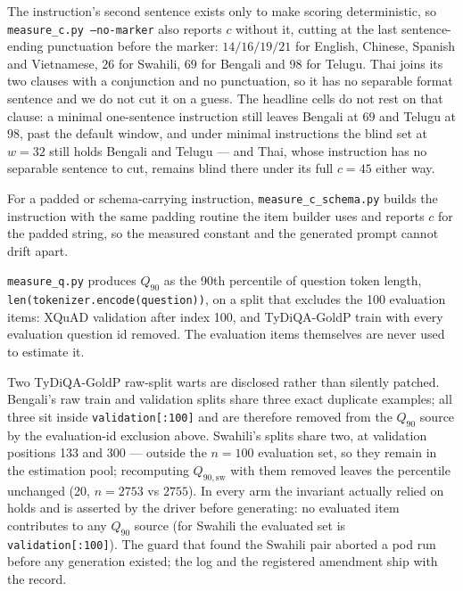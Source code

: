 \documentclass{article}
\begin{document}
The instruction's second sentence exists only to make scoring
deterministic, so \texttt{measure\_c.py --no-marker} also reports $c$
without it, cutting at the last sentence-ending punctuation before the
marker: $14/16/19/21$ for English, Chinese, Spanish and Vietnamese,
$26$ for Swahili, $69$ for Bengali and $98$ for Telugu. Thai joins its
two clauses with a conjunction and no punctuation, so it has no
separable format sentence and we do not cut it on a guess. The headline
cells do not rest on that clause: a minimal one-sentence instruction
still leaves Bengali at $69$ and Telugu at $98$, past the default
window, and under minimal instructions the blind set at $w{=}32$ still
holds Bengali and Telugu --- and Thai, whose instruction has no separable
sentence to cut, remains blind there under its full $c{=}45$ either way.

For a padded or schema-carrying instruction, \texttt{measure\_c\_schema.py}
builds the instruction with the same padding routine the item builder
uses and reports $c$ for the padded string, so the measured constant and
the generated prompt cannot drift apart.

\texttt{measure\_q.py} produces $Q_{90}$ as the 90th percentile of question
token length, \texttt{len(tokenizer.\allowbreak encode(question))}, on a split that
excludes the 100 evaluation items: XQuAD validation after index 100, and TyDiQA-GoldP
train with every evaluation question id removed. The evaluation items
themselves are never used to estimate it.

Two TyDiQA-GoldP raw-split warts are disclosed rather than silently
patched. Bengali's raw train and validation splits share three exact
duplicate examples; all three sit inside \texttt{validation[:100]} and
are therefore removed from the $Q_{90}$ source by the
evaluation-id exclusion above. Swahili's splits share two, at
validation positions 133 and 300 --- outside the $n{=}100$ evaluation
set, so they remain in the estimation pool; recomputing
$Q_{90,\mathrm{sw}}$ with them removed leaves the percentile unchanged
(20, $n{=}2753$ vs $2755$). In every arm the invariant actually relied
on holds and is asserted by the driver before generating: no evaluated
item contributes to any $Q_{90}$ source (for Swahili the evaluated set
is \texttt{validation[:100]}). The guard that found the Swahili pair
aborted a pod run before any generation existed; the log and the
registered amendment ship with the record.
\end{document}
